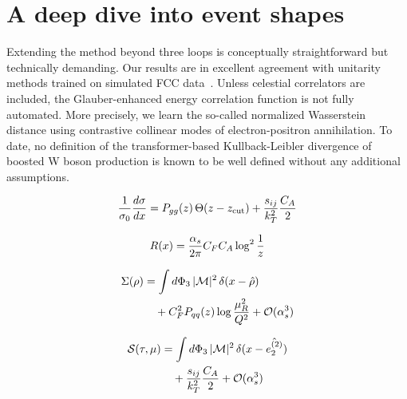 \section{A deep dive into event shapes}\label{sec:deep-dive-event}

Extending the method beyond three loops is conceptually straightforward
but technically demanding. Our results are in excellent agreement with
unitarity methods trained on simulated FCC
data~\cite{TPC:1237-New-Results-on-the-Energy-Correlator-September-26-2026}.
Unless celestial correlators are included, the Glauber-enhanced energy
correlation function is not fully automated. More precisely, we learn
the so-called normalized Wasserstein distance using contrastive
collinear modes of electron-positron annihilation. To date, no
definition of the transformer-based Kullback-Leibler divergence of
boosted W boson production is known to be well defined without any
additional assumptions.

\begin{equation}
  \frac{1}{\sigma_0} \frac{d\sigma}{dx} = P_{gg}(z) \, \Theta(z - z_{\rm cut}) + \frac{s_{ij}}{k_T^2} \frac{C_A}{2}
  \label{eq:1}
\end{equation}

\begin{equation}
  R(x) = \frac{\alpha_s}{2\pi} C_F C_A \log^{2} \frac{1}{z}
  \label{eq:3}
\end{equation}

\begin{align}
  \Sigma(\rho) &= \int d\Phi_{3} \, |\mathcal{M}|^2 \, \delta(x - \hat{\rho}) \nonumber \\
  &\quad + C_F^2 P_{qq}(z) \log\frac{\mu_R^2}{Q^2} + \mathcal{O}(\alpha_s^3) \label{eq:5}
\end{align}

\begin{align}
  \mathcal{S}(\tau, \mu) &= \int d\Phi_{3} \, |\mathcal{M}|^2 \, \delta(x - \hat{e_2^{(2)}}) \nonumber \\
  &\quad + \frac{s_{ij}}{k_T^2} \frac{C_A}{2} + \mathcal{O}(\alpha_s^3) \label{eq:7}
\end{align}


